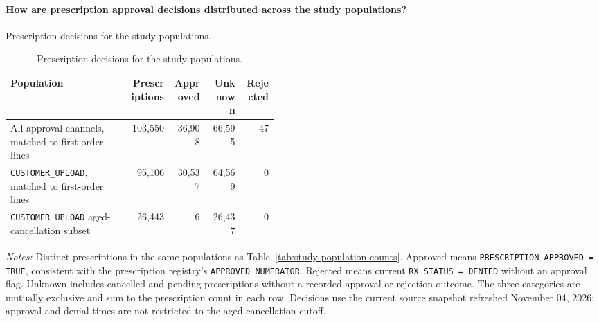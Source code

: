 \paragraph{How are prescription approval decisions distributed across the study populations?}
Prescription decisions for the study populations.

\begin{table}[htbp]
\centering
\caption{Prescription decisions for the study populations.}
\label{tab:study-population-prescription-decisions}
\small
\begin{tabular}{@{}>{\raggedright\arraybackslash}p{0.45\linewidth}rrrr@{}}
\toprule
Population & Prescriptions & Approved & Unknown & Rejected \\
\midrule

All approval channels, matched to first-order lines & 103,550 & 36,908 & 66,595 & 47 \\

\texttt{CUSTOMER\_UPLOAD}, matched to first-order lines & 95,106 & 30,537 & 64,569 & 0 \\

\texttt{CUSTOMER\_UPLOAD} aged-cancellation subset & 26,443 & 6 & 26,437 & 0 \\
\bottomrule
\end{tabular}

\begin{minipage}{\linewidth}
\footnotesize
\textit{Notes:} Distinct prescriptions in the same populations as
Table~\ref{tab:study-population-counts}. Approved means
\texttt{PRESCRIPTION\_APPROVED = TRUE}, consistent with the prescription registry's
\texttt{APPROVED\_NUMERATOR}. Rejected means current \texttt{RX\_STATUS = DENIED}
without an approval flag. Unknown includes cancelled and pending prescriptions
without a recorded approval or rejection outcome. The three categories are
mutually exclusive and sum to the prescription count in each row.
Decisions use the current source snapshot refreshed November 04, 2026;
approval and denial times are not restricted to the aged-cancellation cutoff.
\end{minipage}
\end{table}

